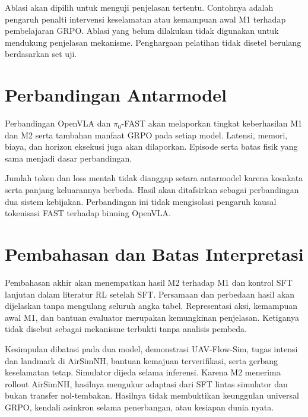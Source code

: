 Ablasi akan dipilih untuk menguji penjelasan tertentu. Contohnya adalah pengaruh penalti intervensi keselamatan atau kemampuan awal M1 terhadap pembelajaran GRPO. Ablasi yang belum dilakukan tidak digunakan untuk mendukung penjelasan mekanisme. Penghargaan pelatihan tidak disetel berulang berdasarkan set uji.

\section{Perbandingan Antarmodel}
\label{sec:hasil_antarmodel}
Perbandingan OpenVLA dan $\pi_0$-FAST akan melaporkan tingkat keberhasilan M1 dan M2 serta tambahan manfaat GRPO pada setiap model. Latensi, memori, biaya, dan horizon eksekusi juga akan dilaporkan. Episode serta batas fisik yang sama menjadi dasar perbandingan.

Jumlah token dan loss mentah tidak dianggap setara antarmodel karena kosakata serta panjang keluarannya berbeda. Hasil akan ditafsirkan sebagai perbandingan dua sistem kebijakan. Perbandingan ini tidak mengisolasi pengaruh kausal tokenisasi FAST terhadap binning OpenVLA.

\section{Pembahasan dan Batas Interpretasi}
\label{sec:pembahasan}
Pembahasan akhir akan menempatkan hasil M2 terhadap M1 dan kontrol SFT lanjutan dalam literatur RL setelah SFT. Persamaan dan perbedaan hasil akan dijelaskan tanpa mengulang seluruh angka tabel. Representasi aksi, kemampuan awal M1, dan bantuan evaluator merupakan kemungkinan penjelasan. Ketiganya tidak disebut sebagai mekanisme terbukti tanpa analisis pembeda.

Kesimpulan dibatasi pada dua model, demonstrasi UAV-Flow-Sim, tugas intensi dan landmark di AirSimNH, bantuan kemajuan terverifikasi, serta gerbang keselamatan tetap. Simulator dijeda selama inferensi. Karena M2 menerima rollout AirSimNH, hasilnya mengukur adaptasi dari SFT lintas simulator dan bukan transfer nol-tembakan. Hasilnya tidak membuktikan keunggulan universal GRPO, kendali asinkron selama penerbangan, atau kesiapan dunia nyata.
